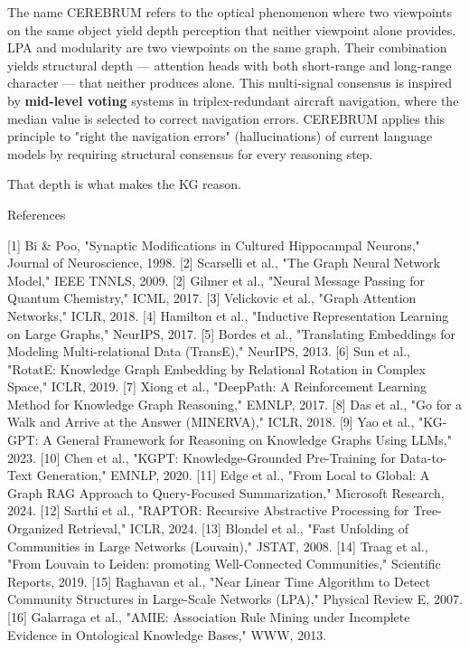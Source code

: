 \documentclass[10pt,journal,compsoc]{IEEEtran}
\begin{document}
The name CEREBRUM refers to the optical phenomenon where two viewpoints on the same object yield depth perception that neither viewpoint alone provides.
LPA and modularity are two viewpoints on the same graph. Their combination yields structural depth — attention heads with both short-range and long-range character — that neither produces alone. This multi-signal consensus is inspired 
by \textbf{mid-level voting} systems in triplex-redundant aircraft navigation, where 
the median value is selected to correct navigation errors. CEREBRUM applies this 
principle to "right the navigation errors" (hallu\-cinations) of current language 
models by requiring structural consensus for every reasoning step.

That depth is what makes the KG reason.

References

[1] Bi \& Poo, "Synaptic Modifi\-cations in Cultured Hippocampal Neurons," Journal of Neuros\-cience, 1998.
[2] Scarselli et al., "The Graph Neural Network Model," IEEE TNNLS, 2009.
[2] Gilmer et al., "Neural Message Passing for Quantum Chemistry," ICML, 2017.
[3] Velickovic et al., "Graph Attention Networks," ICLR, 2018.
[4] Hamilton et al., "Inductive Repres\-entation Learning on Large Graphs," NeurIPS, 2017.
[5] Bordes et al., "Translating Embeddings for Modeling Multi-relational Data (TransE)," NeurIPS, 2013.
[6] Sun et al., "RotatE: Knowledge Graph Embedding by Relational Rotation in Complex Space," ICLR, 2019.
[7] Xiong et al., "DeepPath: A Reinfo\-rcement Learning Method for Knowledge Graph Reasoning," EMNLP, 2017.
[8] Das et al., "Go for a Walk and Arrive at the Answer (MINERVA)," ICLR, 2018.
[9] Yao et al., "KG-GPT: A General Framework for Reasoning on Knowledge Graphs Using LLMs," 2023.
[10] Chen et al., "KGPT: Knowledge-Grounded Pre-Training for Data-to-Text Generation," EMNLP, 2020.
[11] Edge et al., "From Local to Global: A Graph RAG Approach to Query-Focused Summar\-ization," Microsoft Research, 2024.
[12] Sarthi et al., "RAPTOR: Recursive Abstractive Processing for Tree-Organized Retrieval," ICLR, 2024.
[13] Blondel et al., "Fast Unfolding of Communities in Large Networks (Louvain)," JSTAT, 2008.
[14] Traag et al., "From Louvain to Leiden: promoting Well-Connected Communities," Scientific Reports, 2019.
[15] Raghavan et al., "Near Linear Time Algorithm to Detect Community Structures in Large-Scale Networks (LPA)," Physical Review E, 2007.
[16] Galarraga et al., "AMIE: Association Rule Mining under Incomplete Evidence in Ontological Knowledge Bases," WWW, 2013.







\end{document}
